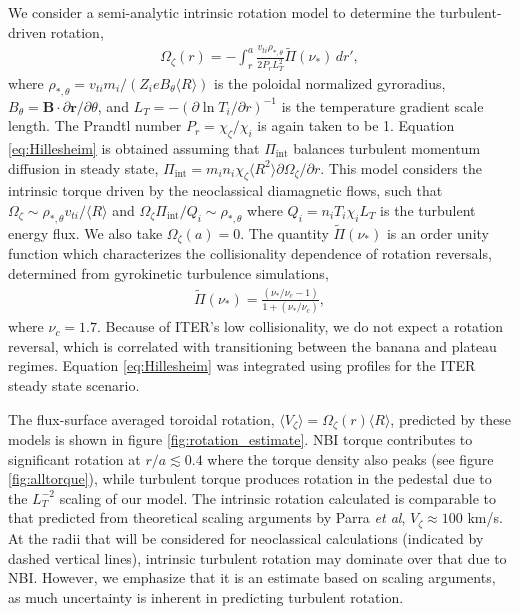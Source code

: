 \documentclass[aip, pop, preprint]{revtex4-1}
\numberwithin{figure}{section}
\numberwithin{equation}{section}
\begin{document}
We consider a semi-analytic intrinsic rotation model to determine the turbulent-driven rotation,\cite{Hillesheim2015}
\begin{gather}
\Omega_{\zeta}(r) = - \int_{r}^a \frac{v_{ti} \rho_{*,\theta}} {2 P_r L_T^2} \widetilde{\Pi} (\nu_*) \, d r',
\label{eq:Hillesheim}
\end{gather} 
where $\rho_{*,\theta} = v_{ti} m_i/(Z_i e B_{\theta} \langle R \rangle)$ is the poloidal normalized gyroradius, $B_{\theta} = \bm{B} \cdot \partial \bm{r}/\partial \theta$, and $L_T = - \left( \partial \ln T_i/ \partial r \right)^{-1}$ is the temperature gradient scale length. The Prandtl number $P_r = \chi_{\zeta}/\chi_i$ is again taken to be 1. Equation \ref{eq:Hillesheim} is obtained assuming that $\Pi_{\mathrm{int}}$ balances turbulent momentum diffusion in steady state, $\Pi_{\mathrm{int}} = m_i n_i \chi_{\zeta} \langle R^2 \rangle \partial \Omega_{\zeta}/\partial r$. This model considers the intrinsic torque driven by the neoclassical diamagnetic flows, such that $\Omega_{\zeta} \sim \rho_{*,\theta} v_{ti}/\langle R \rangle$ and $\Omega_{\zeta} \Pi_{\mathrm{int}}/Q_i \sim \rho_{*, \theta}$ where $Q_i = n_i T_i \chi_i L_T$ is the turbulent energy flux. We also take $\Omega_{\zeta}(a) = 0$. The quantity $\widetilde{\Pi} (\nu_*)$ is an order unity function which characterizes the collisionality dependence of rotation reversals, determined from gyrokinetic turbulence simulations,\cite{Barnes2013}
\begin{gather}
\widetilde{\Pi} (\nu_*) = \frac{(\nu_*/\nu_c -1)}{1 + (\nu_*/\nu_c)},
\end{gather}
where $\nu_c = 1.7$. Because of ITER's low collisionality, we do not expect a rotation reversal, which is correlated with transitioning between the banana and plateau regimes. Equation \ref{eq:Hillesheim} was integrated using profiles for the ITER steady state scenario. 

The flux-surface averaged toroidal rotation, $\langle V_{\zeta} \rangle = \Omega_{\zeta}(r) \langle R \rangle$, predicted by these models is shown in figure \ref{fig:rotation_estimate}. NBI torque contributes to significant rotation at $r/a \lesssim 0.4$ where the torque density also peaks (see figure \ref{fig:alltorque}), while turbulent torque produces rotation in the pedestal due to the $L_T^{-2}$ scaling of our model.  The intrinsic rotation calculated is comparable to that predicted from theoretical scaling arguments by Parra \textit{et al},\cite{Parra2012} $V_{\zeta} \approx 100$ km/s. At the radii that will be considered for neoclassical calculations (indicated by dashed vertical lines), intrinsic turbulent rotation may dominate over that due to NBI. However, we emphasize that it is an estimate based on scaling arguments, as much uncertainty is inherent in predicting turbulent rotation. 
\end{document}
